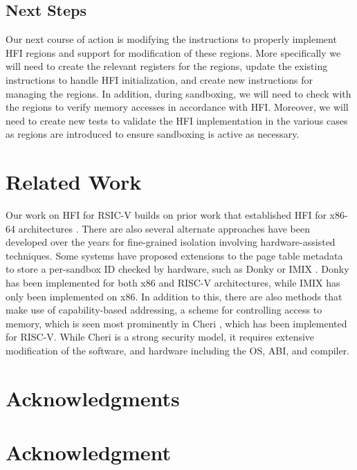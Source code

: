 \documentclass[conference,compsoc]{IEEEtran}
\begin{document}
\subsection{Next Steps}
Our next course of action is modifying the instructions to properly implement HFI regions and support for modification of these regions.
More specifically we will need to create the relevant registers for the regions, update the existing instructions to handle HFI initialization, and create new instructions for managing the regions.
In addition, during sandboxing, we will need to check with the regions to verify memory accesses in accordance with HFI.
Moreover, we will need to create new tests to validate the HFI implementation in the various cases as regions are introduced to ensure sandboxing is active as necessary.

\section{Related Work}
Our work on HFI for RSIC-V builds on prior work that established HFI for x86-64 architectures \cite{HFI}. 
There are also several alternate approaches have been developed over the years for fine-grained isolation involving hardware-assisted techniques. Some systems have proposed extensions to the page table metadata to store a per-sandbox ID checked by hardware, such as Donky \cite{Donky} or IMIX \cite{IMIX}. Donky has been implemented for both x86 and RISC-V architectures, while IMIX has only been implemented on x86. In addition to this, there are also methods that make use of capability-based addressing, a scheme for controlling access to memory, which is seen most prominently in Cheri \cite{CHERI}, which has been implemented for RISC-V. While Cheri is a strong security model, it requires extensive modification of the software, and hardware including the OS, ABI, and compiler.





\ifCLASSOPTIONcompsoc
  \section*{Acknowledgments}
\else
  \section*{Acknowledgment}
\fi
\end{document}
